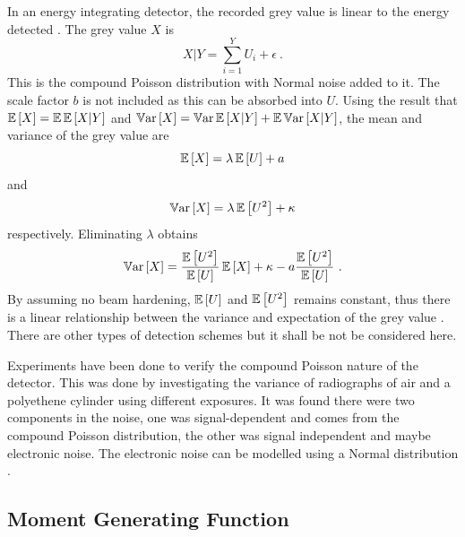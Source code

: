In an energy integrating detector, the recorded grey value is linear to the energy detected \citep{whiting2006properties}. The grey value $X$ is
\begin{equation}
X|Y = \sum_{i=1}^Y U_i + \epsilon \ .
\end{equation}
This is the compound Poisson distribution with Normal noise added to it. The scale factor $b$ is not included as this can be absorbed into $U$. Using the result that $\operatorname{\mathbb{E}}\left[X\right]=\operatorname{\mathbb{E}}\operatorname{\mathbb{E}}\left[X|Y\right]$ and $\operatorname{\mathbb{V}ar}\left[X\right] = \operatorname{\mathbb{V}ar}\operatorname{\mathbb{E}}\left[X|Y\right] + \operatorname{\mathbb{E}}\operatorname{\mathbb{V}ar}\left[X|Y\right]$, the mean and variance of the grey value are
\begin{equation}
\operatorname{\mathbb{E}}\left[X\right] = \lambda\operatorname{\mathbb{E}}\left[U\right]+a
\end{equation}
and
\begin{equation}
\operatorname{\mathbb{V}ar}\left[X\right] = \lambda \operatorname{\mathbb{E}}\left[U^2\right]+\kappa
\end{equation}
respectively. Eliminating $\lambda$ obtains
\begin{equation}
\variance\left[X\right] = \dfrac{\expectation\left[U^2\right]}{\expectation\left[U\right]} \expectation\left[X\right] + \kappa - a\dfrac{\expectation\left[U^2\right]}{\expectation\left[U\right]} \ .
\end{equation}
By assuming no beam hardening, $\operatorname{\mathbb{E}}\left[U\right]$ and $\operatorname{\mathbb{E}}\left[U^2\right]$ remains constant, thus there is a linear relationship between the variance and expectation of the grey value \citep{yang2009evaluation}. There are other types of detection schemes \citep{whiting2006properties} but it shall be not be considered here.

Experiments have been done to verify the compound Poisson nature of the detector. This was done by investigating the variance of radiographs of air \citep{hsieh2015compound} and a polyethene cylinder \citep{yang2009evaluation, yang2010noise} using different exposures. It was found there were two components in the noise, one was signal-dependent and comes from the compound Poisson distribution, the other was signal independent and maybe electronic noise. The electronic noise can be modelled using a Normal distribution \citep{xu2009electronic}.

\subsection{Moment Generating Function}

